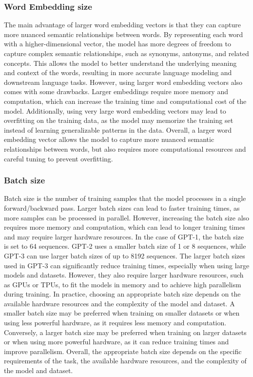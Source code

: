 \documentclass[
	11pt,
	a4paper,
	figtabcapt,
]{oblivoir}
\begin{document}
\subsubsection{Word Embedding size}
The main advantage of larger word embedding vectors is that they can capture more nuanced semantic relationships between words. By representing each word with a higher-dimensional vector, the model has more degrees of freedom to capture complex semantic relationships, such as synonyms, antonyms, and related concepts. This allows the model to better understand the underlying meaning and context of the words, resulting in more accurate language modeling and downstream language tasks.
However, using larger word embedding vectors also comes with some drawbacks. Larger embeddings require more memory and computation, which can increase the training time and computational cost of the model. Additionally, using very large word embedding vectors may lead to overfitting on the training data, as the model may memorize the training set instead of learning generalizable patterns in the data.
Overall, a larger word embedding vector allows the model to capture more nuanced semantic relationships between words, but also requires more computational resources and careful tuning to prevent overfitting.

\subsubsection{Batch size}
Batch size is the number of training samples that the model processes in a single forward/backward pass. Larger batch sizes can lead to faster training times, as more samples can be processed in parallel. However, increasing the batch size also requires more memory and computation, which can lead to longer training times and may require larger hardware resources.
In the case of GPT-1, the batch size is set to 64 sequences. GPT-2 uses a smaller batch size of 1 or 8 sequences, while GPT-3 can use larger batch sizes of up to 8192 sequences. The larger batch sizes used in GPT-3 can significantly reduce training times, especially when using large models and datasets. However, they also require larger hardware resources, such as GPUs or TPUs, to fit the models in memory and to achieve high parallelism during training.
In practice, choosing an appropriate batch size depends on the available hardware resources and the complexity of the model and dataset. A smaller batch size may be preferred when training on smaller datasets or when using less powerful hardware, as it requires less memory and computation. Conversely, a larger batch size may be preferred when training on larger datasets or when using more powerful hardware, as it can reduce training times and improve parallelism.
Overall, the appropriate batch size depends on the specific requirements of the task, the available hardware resources, and the complexity of the model and dataset.
\end{document}
